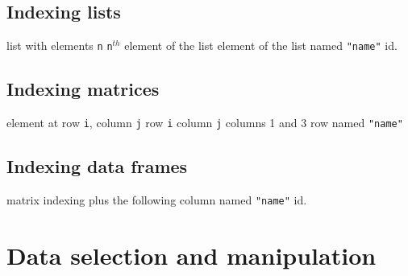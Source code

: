 \subsection{Indexing lists}{}
	{list with elements {\tt n}}
	{{\tt n}$^{th}$ element of the list}
	{element of the list named {\tt "name"}}
	{id.}

\subsection{Indexing matrices}{}
	{element at row {\tt i}, column {\tt j}}
	{row {\tt i}}
	{column {\tt j}}
	{columns 1 and 3}
	{row named {\tt "name"}}

\subsection{Indexing data frames}{matrix indexing plus the following}
	{column named {\tt "name"}}
	{id.}

\section{Data selection and manipulation}{}
